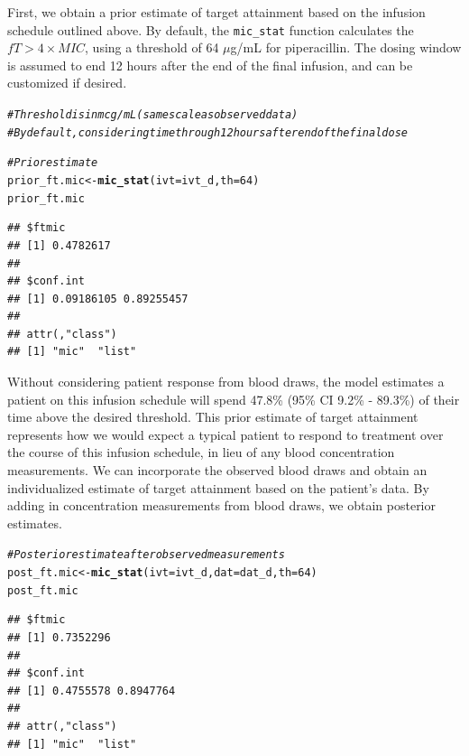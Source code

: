 \documentclass{article}\usepackage[]{graphicx}\usepackage[]{color}
\makeatletter
\newcommand{\hlnum}[1]{\textcolor[rgb]{0.686,0.059,0.569}{#1}}%
\newcommand{\hlcom}[1]{\textcolor[rgb]{0.678,0.584,0.686}{\textit{#1}}}%
\newcommand{\hlstd}[1]{\textcolor[rgb]{0.345,0.345,0.345}{#1}}%
\newcommand{\hlkwb}[1]{\textcolor[rgb]{0.69,0.353,0.396}{#1}}%
\newcommand{\hlkwc}[1]{\textcolor[rgb]{0.333,0.667,0.333}{#1}}%
\newcommand{\hlkwd}[1]{\textcolor[rgb]{0.737,0.353,0.396}{\textbf{#1}}}%
\newenvironment{kframe}{%
 \def\at@end@of@kframe{}%
 \ifinner\ifhmode%
  \def\at@end@of@kframe{\end{minipage}}%
  \begin{minipage}{\columnwidth}%
 \fi\fi%
 \def\FrameCommand##1{\hskip\@totalleftmargin \hskip-\fboxsep
 \colorbox{shadecolor}{##1}\hskip-\fboxsep
     \hskip-\linewidth \hskip-\@totalleftmargin \hskip\columnwidth}%
 \MakeFramed {\advance\hsize-\width
   \@totalleftmargin\z@ \linewidth\hsize
   \@setminipage}}%
 {\par\unskip\endMakeFramed%
 \at@end@of@kframe}
\newenvironment{knitrout}{}{} %
\makeatother
\begin{document}
First, we obtain a prior estimate of target attainment based on the infusion schedule outlined above. By default, the \texttt{mic\_stat} function calculates the $fT > 4 \times MIC$, using a threshold of 64 $\mu$g/mL for piperacillin. The dosing window is assumed to end 12 hours after the end of the final infusion, and can be customized if desired.
\begin{knitrout}
\color{fgcolor}\begin{kframe}
\begin{alltt}
\hlcom{# Threshold is in mcg/mL (same scale as observed data)}
\hlcom{# By default, considering time through 12 hours after end of the final dose}

\hlcom{# Prior estimate}
\hlstd{prior_ft.mic} \hlkwb{<-} \hlkwd{mic_stat}\hlstd{(}\hlkwc{ivt} \hlstd{= ivt_d,} \hlkwc{th} \hlstd{=} \hlnum{64}\hlstd{)}
\hlstd{prior_ft.mic}
\end{alltt}
\begin{verbatim}
## $ftmic
## [1] 0.4782617
## 
## $conf.int
## [1] 0.09186105 0.89255457
## 
## attr(,"class")
## [1] "mic"  "list"
\end{verbatim}
\end{kframe}
\end{knitrout}

Without considering patient response from blood draws, the model estimates a patient on this infusion schedule will spend 47.8\% (95\% CI 9.2\% - 89.3\%) of their time above the desired threshold. This prior estimate of target attainment represents how we would expect a typical patient to respond to treatment over the course of this infusion schedule, in lieu of any blood concentration measurements. We can incorporate the observed blood draws and obtain an individualized estimate of target attainment based on the patient's data. By adding in concentration measurements from blood draws, we obtain posterior estimates.

\begin{knitrout}
\color{fgcolor}\begin{kframe}
\begin{alltt}
\hlcom{# Posterior estimate after observed measurements}
\hlstd{post_ft.mic} \hlkwb{<-} \hlkwd{mic_stat}\hlstd{(}\hlkwc{ivt} \hlstd{= ivt_d,} \hlkwc{dat} \hlstd{= dat_d,} \hlkwc{th} \hlstd{=} \hlnum{64}\hlstd{)}
\hlstd{post_ft.mic}
\end{alltt}
\begin{verbatim}
## $ftmic
## [1] 0.7352296
## 
## $conf.int
## [1] 0.4755578 0.8947764
## 
## attr(,"class")
## [1] "mic"  "list"
\end{verbatim}
\end{kframe}
\end{knitrout}
\end{document}
